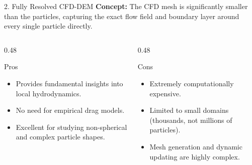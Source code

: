 \begin{frame}{2. Fully Resolved CFD-DEM}
    \textbf{Concept:} The CFD mesh is significantly smaller than the particles, capturing the exact flow field and boundary layer around every single particle directly.
    \vspace{0.3cm}
    
    \begin{columns}[T]
        \begin{column}{0.48\textwidth}
            \begin{block}{Pros}
                \begin{itemize}
                    \item Provides fundamental insights into local hydrodynamics.
                    \item No need for empirical drag models.
                    \item Excellent for studying non-spherical and complex particle shapes.
                \end{itemize}
            \end{block}
        \end{column}
        
        \begin{column}{0.48\textwidth}
            \begin{alertblock}{Cons}
                \begin{itemize}
                    \item Extremely computationally expensive.
                    \item Limited to small domains (thousands, not millions of particles).
                    \item Mesh generation and dynamic updating are highly complex.
                \end{itemize}
            \end{alertblock}
        \end{column}
    \end{columns}
\end{frame}


